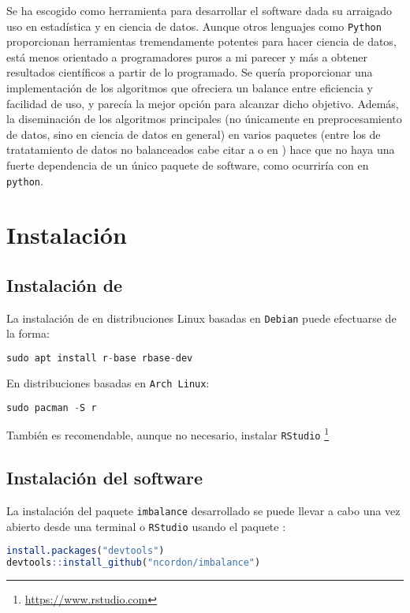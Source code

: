 Se ha escogido \R como herramienta para desarrollar el software dada su arraigado uso en estadística y en ciencia
de datos. Aunque otros lenguajes como \texttt{Python} proporcionan herramientas tremendamente potentes para
hacer ciencia de datos, \R está menos orientado a programadores puros a mi parecer y más a obtener resultados
científicos a partir de lo programado. Se quería proporcionar una implementación de los algoritmos que 
ofreciera un balance entre eficiencia y facilidad de uso, y \R parecía la mejor opción para alcanzar dicho
objetivo. Además, la diseminación de los algoritmos principales (no únicamente en preprocesamiento de datos,
sino en ciencia de datos en general) en varios paquetes (entre los de tratatamiento de datos no balanceados cabe
citar a  o  en \R) hace que no haya una fuerte dependencia de un 
único paquete de software, como ocurriría con  en \texttt{python}.

\section{Instalación}
\subsection{Instalación de \R}
La instalación de \R en distribuciones Linux basadas en \texttt{Debian} puede efectuarse de la forma:
\begin{lstlisting}[language=R,numbers=none]
sudo apt install r-base rbase-dev
\end{lstlisting}

En distribuciones basadas en \texttt{Arch Linux}:
\begin{lstlisting}[language=R,numbers=none]
sudo pacman -S r
\end{lstlisting}

También es recomendable, aunque no necesario, instalar \texttt{RStudio} \footnote{\url{https://www.rstudio.com}}

\subsection{Instalación del software}
La instalación del paquete \texttt{imbalance} desarrollado se puede llevar a cabo una vez abierto desde 
una terminal \R o \texttt{RStudio} usando el paquete :
\begin{lstlisting}[language=R,numbers=none]
install.packages("devtools")
devtools::install_github("ncordon/imbalance")
\end{lstlisting}

